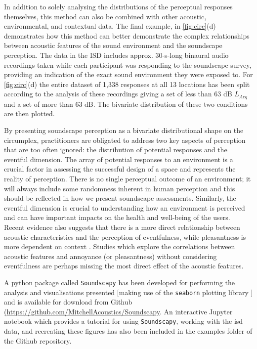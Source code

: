 In addition to solely analysing the distributions of the perceptual responses themselves, this method can also be combined with other acoustic, environmental, and contextual data. The final example, in \cref{fig:circ}(d) demonstrates how this method can better demonstrate the complex relationships between acoustic features of the sound environment and the soundscape perception. The data in the ISD includes approx. 30-s-long binaural audio recordings taken while each participant was responding to the soundscape survey, providing an indication of the exact sound environment they were exposed to. For \cref{fig:circ}(d) the entire dataset of 1,338 responses at all 13 locations has been split according to the analysis of these recordings giving a set of less than 63 dB $L_{Aeq}$ and a set of more than 63 dB. The bivariate distribution of these two conditions are then plotted.

By presenting soundscape perception as a bivariate distributional shape on the circumplex, practitioners are obligated to address two key aspects of perception that are too often ignored: the distribution of potential responses and the eventful dimension. The array of potential responses to an environment is a crucial factor in assessing the successful design of a space and represents the reality of perception. There is no single perceptual outcome of an environment; it will always include some randomness inherent in human perception and this should be reflected in how we present soundscape assessments. Similarly, the eventful dimension is crucial to understanding how an environment is perceived and can have important impacts on the health and well-being of the users. Recent evidence also suggests that there is a more direct relationship between acoustic characteristics and the perception of eventfulness, while pleasantness is more dependent on context \citep{Mitchell2021Investigating}. Studies which explore the correlations between acoustic features and annoyance (or pleasantness) without considering eventfulness are perhaps missing the most direct effect of the acoustic features.

A python package called \texttt{Soundscapy} has been developed for performing the analysis and visualisations presented [making use of the \texttt{seaborn} plotting library \citep{Waskom2021seaborn}] and is available for download from Github \url{(https://github.com/MitchellAcoustics/Soundscapy}. An interactive Jupyter notebook which provides a tutorial for using \texttt{Soundscapy}, working with the \gls{isd} data, and recreating these figures has also been included in the examples folder of the Github repository.

